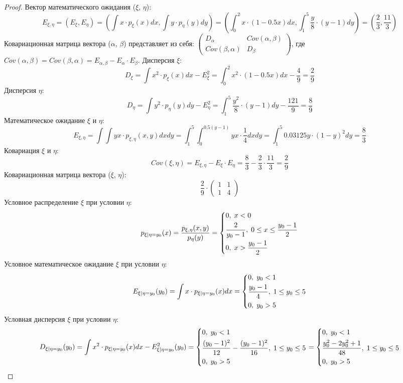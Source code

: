 \begin{proof}
	Вектор математического ожидания ($\xi$, $\eta$):
	\[
		E_{\xi, \eta} = (E_\xi, E_\eta) = (\int x \cdot p_\xi(x) dx, \int y \cdot p_\eta(y) dy) = (\int_{0}^{2} x \cdot (1 - 0.5x) dx, \int_{1}^{5} \frac{y}{8} \cdot (y - 1) dy) = (\frac{2}{3}, \frac{11}{3})
	\]
	Ковариационная матрица вектора ($\alpha$, $\beta$) представляет из себя:
	$\begin{pmatrix}
		D_\alpha & Cov(\alpha, \beta)\\
		Cov(\beta, \alpha) & D_\beta
	\end{pmatrix}$, где $Cov(\alpha, \beta) = Cov(\beta, \alpha) = E_{\alpha, \beta} - E_\alpha \cdot E_\beta$.
	\newline
	Дисперсия $\xi$:
	\[
		D_\xi = \int x^2 \cdot p_\xi(x) dx - E_\xi^2 = \int_{0}^{2} x^2 \cdot (1 - 0.5x) dx - \frac{4}{9} = \frac{2}{9}
	\]
	Дисперсия $\eta$:
	\[
		D_\eta = \int y^2 \cdot p_\eta(y) dy - E_\eta^2 = \int_{1}^{5} \frac{y^2}{8} \cdot (y - 1) dy - \frac{121}{9} = \frac{8}{9}
	\]
	Математическое ожидание $\xi$ и $\eta$:
	\[
		E_{\xi, \eta} = \int \int yx \cdot p_{\xi, \eta}(x, y) dxdy = \int_{1}^{5} \int_{0}^{0.5(y-1)} yx \cdot \frac{1}{4} dxdy = \int_{1}^{5} 0.03125y \cdot (1 - y)^2 dy = \frac{8}{3}
	\]
	Ковариация $\xi$ и $\eta$:
	\[
		Cov(\xi, \eta) = E_{\xi, \eta} - E_\xi \cdot E_\eta = \frac{8}{3} - \frac{2}{3} \cdot \frac{11}{3} = \frac{2}{9}
	\]
	Ковариационная матрица вектора ($\xi$, $\eta$):
	\[
		\frac{2}{9} \cdot
		\begin{pmatrix}
			1 & 1\\
			1 & 4
		\end{pmatrix}
	\]
	Условное распределение $\xi$ при условии $\eta$:
	\[
		p_{\xi|\eta = y_0}(x) = \frac{p_{\xi, \eta}(x, y)}{p_\eta(y)} =
		\begin{dcases}
			0, \; x < 0\\
			\frac{2}{y_0 - 1}, \; 0 \le x \le \frac{y_0 - 1}{2}\\
			0, \; x > \frac{y_0 - 1}{2}
		\end{dcases}
	\]
	Условное математическое ожидание $\xi$ при условии $\eta$:
	\[
		E_{\xi|\eta = y_0}(y_0) = \int x \cdot p_{\xi|\eta = y_0}(x) dx =
		\begin{dcases}
			0, \; y_0 < 1\\
			\frac{y_0 - 1}{4}, \; 1 \le y_0 \le 5\\
			0, \; y_0 > 5
		\end{dcases}
	\]
	Условная дисперсия $\xi$ при условии $\eta$:
	\[
		D_{\xi|\eta = y_0}(y_0) = \int x^2 \cdot p_{\xi|\eta = y_0}(x) dx - E_{\xi|\eta = y_0}^2(y_0) =
		\begin{dcases}
			0, \; y_0 < 1\\
			\frac{(y_0 - 1)^2}{12} - \frac{(y_0 - 1)^2}{16}, \; 1 \le y_0 \le 5\\
			0, \; y_0 > 5
		\end{dcases} =
		\begin{dcases}
			0, \; y_0 < 1\\
			\frac{y_0^2 - 2y_0^2 + 1}{48}, \; 1 \le y_0 \le 5\\
			0, \; y_0 > 5
		\end{dcases}
	\]
\end{proof}

